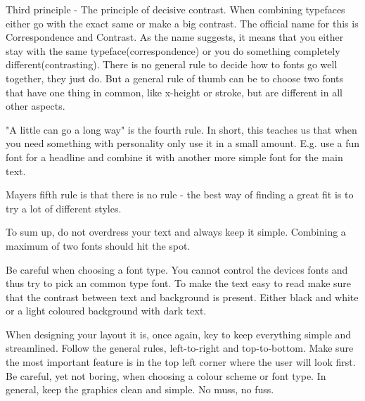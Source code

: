 Third principle - The principle of decisive contrast. When combining typefaces either go with the exact same or make a big contrast. The official name for this is Correspondence and Contrast. As the name suggests, it means that you either stay with the same typeface(correspondence) or you do something completely different(contrasting).\cite{Font}
There is no general rule to decide how to fonts go well together, they just do. But a general rule of thumb can be to choose two fonts that have one thing in common, like x-height or stroke, but are different in all other aspects. 

"A little can go a long way" is the fourth rule. In short, this teaches us that when you need something with personality only use it in a small amount. E.g. use a fun font for a headline and combine it with another more simple font for the main text. 

Mayers fifth rule is that there is no rule - the best way of finding a great fit is to try a lot of different styles. \cite{Font}

To sum up, do not overdress your text and always keep it simple. Combining a maximum of two fonts should hit the spot.\cite{TypeComb}

Be careful when choosing a font type. You cannot control the devices fonts and thus try to pick an common type font.  \cite{Graphic} To make the text easy to read make sure that the contrast between text and background is present. Either black and white or a light coloured background with dark text. \cite{Graphic}

When designing your layout it is, once again, key to keep everything simple and streamlined. 
Follow the general rules, left-to-right and top-to-bottom. Make sure the most important feature is in the top left corner where the user will look first.\cite{Graphic}
Be careful, yet not boring, when choosing a colour scheme or font type. 
In general, keep the graphics clean and simple. No muss, no fuss. 